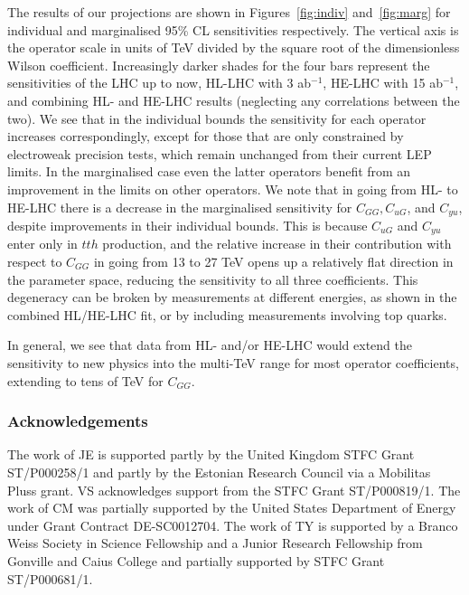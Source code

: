 \documentclass[../report.tex]{subfiles}
\providecommand{\main}{..}
\begin{document}
The results of our projections are shown in Figures~\ref{fig:indiv} and~\ref{fig:marg} for individual and marginalised 95\% CL sensitivities respectively. The vertical axis is the operator scale in units of TeV divided by the square root of the dimensionless Wilson coefficient. Increasingly darker shades for the four bars represent the sensitivities of the LHC up to now, HL-LHC with 3 ab$^{-1}$, HE-LHC with 15 ab$^{-1}$, and combining HL- and HE-LHC results (neglecting any correlations between the two). We see that in the individual bounds the sensitivity for each operator increases correspondingly, except for those that are only constrained by electroweak precision tests, which remain unchanged from their current LEP limits. In the marginalised case even the latter operators benefit from an improvement in the limits on other operators. We note that in going from HL- to HE-LHC there is a decrease in the marginalised sensitivity for $C_{GG}, C_{uG}$, and $C_{yu}$, despite improvements in their individual bounds. This is because $C_{uG}$ and $C_{yu}$ enter only in $tth$ production, and the relative increase in their contribution with respect to $C_{GG}$ in going from 13 to 27 TeV opens up a relatively flat direction in the parameter space, reducing the sensitivity to all three coefficients. This degeneracy can be broken by measurements at different energies, as shown in the combined HL/HE-LHC fit, or by including measurements involving top quarks.

In general, we see that data from HL- and/or HE-LHC would extend the sensitivity to new physics into the multi-TeV range
for most operator coefficients, extending to tens of TeV for $C_{GG}$.



\subsubsection*{Acknowledgements}
The work of JE is supported partly by the United Kingdom STFC Grant ST/P000258/1 and partly by the Estonian Research Council via a Mobilitas Pluss grant. VS acknowledges support from the STFC Grant ST/P000819/1. The work of CM was partially supported by the United States Department of Energy under Grant Contract DE-SC0012704. The work of TY is supported by a Branco Weiss Society in Science Fellowship and a Junior Research Fellowship from Gonville and Caius College and partially supported by STFC Grant ST/P000681/1.







\end{document}
